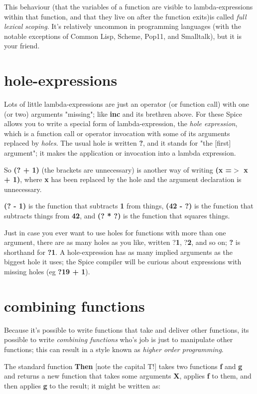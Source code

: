 \documentclass{report}
\begin{document}
This behaviour (that the variables of a function are visible to
lambda-expressions within that function, and that they live on after the
function exits)is called {\em full lexical scoping}. It's relatively uncommon
in programming languages (with the notable exceptions of Common Lisp, Scheme,
Pop11, and Smalltalk), but it is your friend.\section{hole-expressions}


Lots of little lambda-expressions are just an operator (or function call)
with one (or two) arguments "missing"; like {\bf inc} and its brethren above.
For these Spice allows you to write a special form of lambda-expression, the
{\em hole expression}, which is a function call or operator invocation with
some of its arguments replaced by {\em holes}. The usual hole is written {\bf ?},
and it stands for "the {[}first{]} argument"; it makes the application or
invocation into a lambda expression.

So {\bf (? + 1)} (the brackets are unnecessary) is another way of writing {\bf (x =$>$
x + 1)}, where {\bf x} has been replaced by the hole and the argument declaration
is unnecessary.

{\bf (? - 1)} is the function that subtracts {\bf 1} from things, {\bf (42 - ?)} is
the function that subtracts things from {\bf 42}, and {\bf (? * ?)} is the
function that squares things.

Just in case you ever want to use holes for functions with more than one
argument, there are as many holes as you like, written ?{\bf 1}, ?{\bf 2}, and so
on; {\bf ?} is shorthand for {\bf ?1}. A hole-expression has as many implied
arguments as the biggest hole it uses; the Spice compiler will be curious
about expressions with missing holes (eg {\bf ?19 + 1}).\section{combining functions}


Because it's possible to write functions that take and deliver other
functions, its possible to write {\em combining functions} who's job is just
to manipulate other functions; this can result in a style known as {\em higher
order programming}.

The standard function {\bf Then} {[}note the capital T!{]} takes two functions
{\bf f} and {\bf g} and returns a new function that takes some arguments {\bf X},
applies {\bf f} to them, and then applies {\bf g} to the result; it might be written
as:
\end{document}
